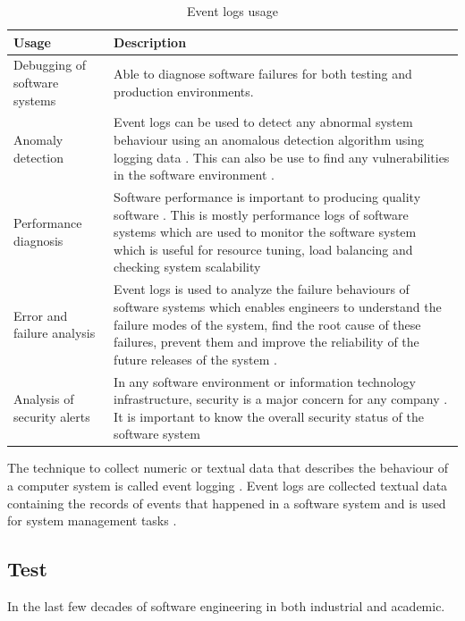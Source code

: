 \begin{table}[!htb]
	\centering
	\small
	\caption{Event logs usage}
	\label{tbl:CH1_EventLogsUsage}
	\begin{tabularx}{\textwidth}{|l|X|}
		\hline \textbf{Usage} & \textbf{Description} \\
		\hline Debugging of software systems & Able to diagnose software failures for both testing and production environments.\\
		\hline Anomaly detection & Event logs can be used to detect any abnormal system behaviour using an anomalous detection algorithm using logging data \cite{Gurumdimma2016}.  This can also be use to find any vulnerabilities in the software environment \cite{Dwyer2013}. \\
		\hline Performance diagnosis & Software performance is important to producing quality software \cite{EvangelinGeetha2007,Baccanico2014}. This is mostly performance logs of software systems which are used to monitor the software system which is useful for resource tuning, load balancing and checking system scalability \cite{Sosnowski2014} \\ 
		\hline Error and failure analysis & Event logs is used to analyze the failure behaviours of software systems which enables engineers to understand the failure modes of the system, find the root cause of these failures, prevent them and improve the reliability of the future releases of the system \cite{Cinque2013}.\\
		\hline Analysis of security alerts & In any software environment or information technology infrastructure, security is a major concern for any company \cite{Pathan2014, Dwyer2013}. It is important to know the overall security status of the software system \\
		\hline
	\end{tabularx}
\end{table}


\clearpage

The technique to collect numeric or textual data that describes the behaviour of a computer system is called event logging \cite{Pecchia2015, Baccanico2014}. Event logs are collected textual data containing the records of events that happened in a software system and is used for system management tasks \cite{Rong2018a, Rong2018, Baccanico2014}.

\subsection{Test}
In the last few decades of software engineering in both industrial and academic.

